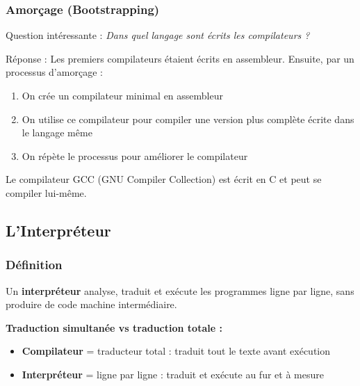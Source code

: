 \documentclass[12pt,a4paper]{article}
\begin{document}
\newpage
{}
\subsubsection{Amorçage (Bootstrapping)}

\begin{important}
Question intéressante : \textit{Dans quel langage sont écrits les compilateurs ?}

Réponse : Les premiers compilateurs étaient écrits en assembleur.  Ensuite, par un processus d'amorçage : 

\begin{enumerate}
    \item On crée un compilateur minimal en assembleur
    \item On utilise ce compilateur pour compiler une version plus complète écrite dans le langage même
    \item On répète le processus pour améliorer le compilateur
\end{enumerate}
\end{important}

\begin{exemple}
Le compilateur GCC (GNU Compiler Collection) est écrit en C et peut se compiler lui-même.
\end{exemple}

\subsection{L'Interpréteur}

\subsubsection{Définition}

\begin{definition}
Un \textbf{interpréteur} analyse, traduit et exécute les programmes ligne par ligne, sans produire de code machine intermédiaire.
\end{definition}

\begin{notecours}
\textbf{Traduction simultanée vs traduction totale :}

\begin{itemize}
    \item \textbf{Compilateur} = traducteur total :  traduit tout le texte avant exécution
    \item \textbf{Interpréteur} = ligne par ligne : traduit et exécute au fur et à mesure
\end{itemize}
\end{notecours}
\end{document}
